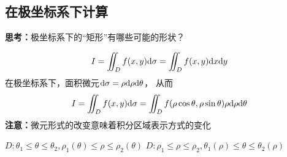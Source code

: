 \subsection{在极坐标系下计算}

{\bf 思考：}极坐标系下的“矩形”有哪些可能的形状？

$$I=\iint_Df(x,y)\mathrm{d}\sigma=\iint_Df(x,y)\mathrm{d} x\mathrm{d} y$$
在极坐标系下，面积微元${\mathrm{d}\sigma=\rho \mathrm{d}\rho \mathrm{d}\theta}$， 
从而
$${I=\iint_Df(x,y)\mathrm{d}\sigma=\iint_Df(\rho\cos\theta,\rho\sin\theta)
\rho \mathrm{d}\rho \mathrm{d}\theta}$$
{\bf 注意：}微元形式的改变意味着积分区域表示方式的变化

\begin{center}
	\hspace{2cm}
	
	$D:\theta_1\leq\theta\leq\theta_2,\rho_1(\theta)\leq\rho\leq\rho_2(\theta)$
	\hspace{2cm}
	$D:\rho_1\leq\rho\leq\rho_2,\theta_1(\rho)\leq\theta\leq\theta_2(\rho)$
\end{center}


